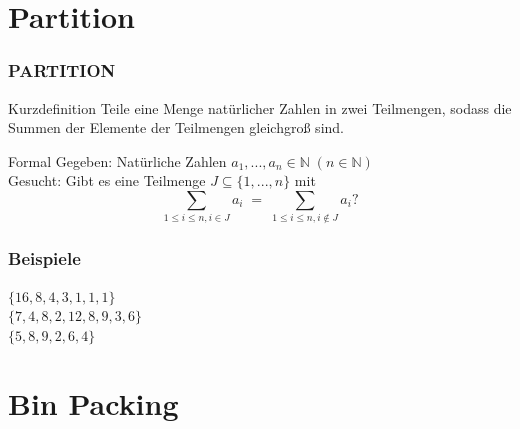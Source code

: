 \section{Partition}
\begin{frame}
	\frametitle{PARTITION}
	\begin{block}{Kurzdefinition}
	Teile eine Menge natürlicher Zahlen in zwei Teilmengen, sodass die Summen der Elemente der Teilmengen gleichgroß sind.
	\end{block}
	\begin{block}{Formal}
	Gegeben: Natürliche Zahlen $a_1,...,a_n \in \mathbb{N} \; (n \in 	\mathbb{N})$\\
	Gesucht: Gibt es eine Teilmenge $J \subseteq \{1,...,n\}$ mit\\
	\[\sum\limits_{1 \leq i \leq n, i \in J}a_i \; = \;
	\sum\limits_{1 \leq i \leq n, i \notin J}a_i \text{?}\]
	\end{block}
\end{frame}
\begin{frame}
	\frametitle{Beispiele}
	$\{16,8,4,3,1,1,1\}$\\
	$\{7,4,8,2,12,8,9,3,6\}$\\
	$\{5,8,9,2,6,4\}$
\end{frame}

\section{Bin Packing}
